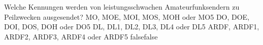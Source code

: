     {Welche Kennungen werden von leistungsschwachen Amateurfunksendern zu Peilzwecken ausgesendet?}
    {MO, MOE, MOI, MOS, MOH oder MO5}
    {DO, DOE, DOI, DOS, DOH oder DO5}
    {DL, DL1, DL2, DL3, DL4 oder DL5}
    {ARDF, ARDF1, ARDF2, ARDF3, ARDF4 oder ARDF5}
    {false}{false}